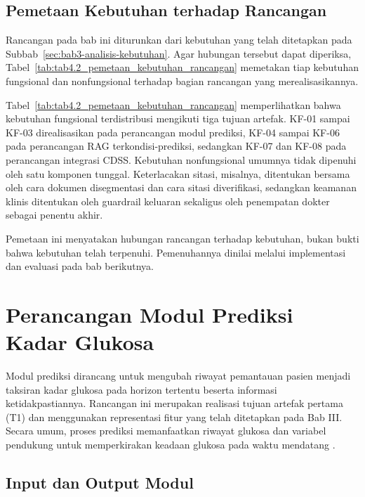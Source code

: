 \subsection{Pemetaan Kebutuhan terhadap Rancangan}
\label{subsec:bab4-pemetaan-kebutuhan-rancangan}

Rancangan pada bab ini diturunkan dari kebutuhan yang telah ditetapkan pada Subbab~\ref{sec:bab3-analisis-kebutuhan}. Agar hubungan tersebut dapat diperiksa,
Tabel~\ref{tab:tab4.2_pemetaan_kebutuhan_rancangan} memetakan tiap kebutuhan fungsional dan nonfungsional terhadap bagian rancangan yang merealisasikannya.



Tabel~\ref{tab:tab4.2_pemetaan_kebutuhan_rancangan} memperlihatkan bahwa kebutuhan fungsional terdistribusi mengikuti tiga tujuan artefak. KF-01 sampai KF-03 direalisasikan pada perancangan modul
prediksi, KF-04 sampai KF-06 pada perancangan RAG terkondisi-prediksi, sedangkan KF-07 dan KF-08 pada perancangan integrasi CDSS. Kebutuhan nonfungsional
umumnya tidak dipenuhi oleh satu komponen tunggal. Keterlacakan sitasi, misalnya, ditentukan bersama oleh cara dokumen disegmentasi dan cara sitasi diverifikasi,
sedangkan keamanan klinis ditentukan oleh guardrail keluaran sekaligus oleh penempatan dokter sebagai penentu akhir.

Pemetaan ini menyatakan hubungan rancangan terhadap kebutuhan, bukan bukti bahwa kebutuhan telah terpenuhi. Pemenuhannya dinilai melalui implementasi dan evaluasi
pada bab berikutnya.

\section{Perancangan Modul Prediksi Kadar Glukosa} 
\label{sec:bab4-perancangan-modul-prediksi}

Modul prediksi dirancang untuk mengubah riwayat pemantauan pasien menjadi taksiran kadar glukosa pada horizon tertentu beserta informasi ketidakpastiannya. Rancangan ini merupakan
realisasi tujuan artefak pertama (T1) dan menggunakan representasi fitur yang telah ditetapkan pada Bab III. Secara umum, proses prediksi memanfaatkan riwayat glukosa dan variabel
pendukung untuk memperkirakan keadaan glukosa pada waktu mendatang \parencite{woldaregay2019}.

\subsection{Input dan Output Modul} 
\label{subsec:bab4-input-output-modul-prediksi}

